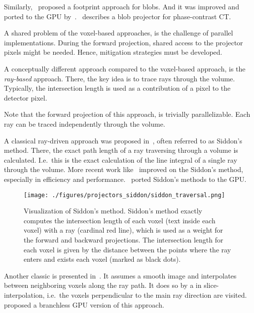 Similarly,~\cite{ziegler_efficient_2006} proposed a footprint approach for blobs. And it was
improved and ported to the \gls{GPU} by~\cite{bippus_projector_2011}.~\cite{kohler_iterative_2011}
describes a blob projector for phase-contrast CT\@.

A shared problem of the voxel-based approaches, is the challenge of parallel implementations. During
the forward projection, shared access to the projector pixels might be needed. Hence, mitigation
strategies must be developed.

A conceptually different approach compared to the voxel-based approach, is the \textit{ray-based}
approach. There, the key idea is to trace rays through the volume. Typically, the intersection
length is used as a contribution of a pixel to the detector pixel.

Note that the forward projection of this approach, is trivially parallelizable. Each ray can be
traced independently through the volume.

A classical ray-driven approach was proposed in~\cite{siddon_fast_1985}, often referred to as
Siddon's method. There, the exact path length of a ray traversing through a volume is calculated.
I.e.\ this is the exact calculation of the line integral of a single ray through the volume. More
recent work like~\cite{jacobs_fast_1998, christiaens_fast_1999, zhao_fast_2004, gao_fast_2012}
improved on the Siddon's method, especially in efficiency and
performance.~\cite{de_greef_accelerated_2009, xiao_efficient_2012} ported Siddon's methods to the
\gls{GPU}\@.


\begin{figure}[h]
	\centering
	\texttt{[image: ./figures/projectors\_siddon/siddon\_traversal.png]}
	\caption{Visualization of Siddon's method. Siddon's method exactly computes the intersection
		length of each voxel (text inside each voxel) with a ray (cardinal red line), which
		is used as a weight for the forward and backward projections. The intersection
		length for each voxel is given by the distance between the points where the ray
		enters and exists each voxel (marked as black
                dots).}\label{fig:visualization_siddon_traversal}
\end{figure}

Another classic is presented in~\cite{joseph_improved_1982}. It assumes a smooth image and
interpolates between neighboring voxels along the ray path. It does so by a in slice-interpolation,
i.e.\ the voxels perpendicular to the main ray direction are visited.~\cite{graetz_high_2020}
proposed a branchless \gls{GPU} version of this approach.

